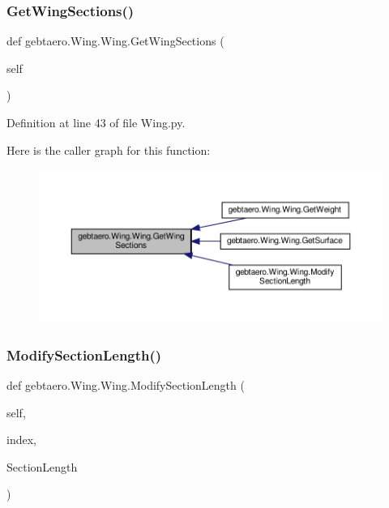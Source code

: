 \mbox{\label{classgebtaero_1_1_wing_1_1_wing_a9fbfa35745a94279f37ebf497a36126e}} 
\subsubsection{\texorpdfstring{Get\+Wing\+Sections()}{GetWingSections()}}
{\footnotesize\ttfamily def gebtaero.\+Wing.\+Wing.\+Get\+Wing\+Sections (\begin{DoxyParamCaption}\item[{}]{self }\end{DoxyParamCaption})}



Definition at line 43 of file Wing.\+py.

Here is the caller graph for this function\+:
\nopagebreak
\begin{figure}[H]
\begin{center}
\leavevmode
\includegraphics[width=350pt]{classgebtaero_1_1_wing_1_1_wing_a9fbfa35745a94279f37ebf497a36126e_icgraph}
\end{center}
\end{figure}
\mbox{\label{classgebtaero_1_1_wing_1_1_wing_a3b5df3a1833448d36becf9a5a9f3e951}} 
\subsubsection{\texorpdfstring{Modify\+Section\+Length()}{ModifySectionLength()}}
{\footnotesize\ttfamily def gebtaero.\+Wing.\+Wing.\+Modify\+Section\+Length (\begin{DoxyParamCaption}\item[{}]{self,  }\item[{}]{index,  }\item[{}]{Section\+Length }\end{DoxyParamCaption})}



